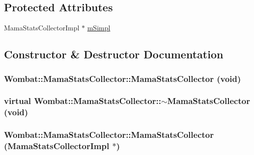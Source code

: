 \subsection*{Protected Attributes}
\begin{DoxyCompactItemize}
\item 
MamaStatsCollectorImpl $\ast$ \hyperlink{classWombat_1_1MamaStatsCollector_ac451f4b0b0326f503b3301f7b89a9e36}{mSimpl}
\end{DoxyCompactItemize}


\subsection{Constructor \& Destructor Documentation}
\hypertarget{classWombat_1_1MamaStatsCollector_ade3bf71a38b6085d9922a0276c9960a1}{
\subsubsection[{MamaStatsCollector}]{\setlength{\rightskip}{0pt plus 5cm}Wombat::MamaStatsCollector::MamaStatsCollector (void)}}
\label{classWombat_1_1MamaStatsCollector_ade3bf71a38b6085d9922a0276c9960a1}
\hypertarget{classWombat_1_1MamaStatsCollector_adaa09d4d8b5d79473d5abb4b257d9e02}{
\subsubsection[{$\sim$MamaStatsCollector}]{\setlength{\rightskip}{0pt plus 5cm}virtual Wombat::MamaStatsCollector::$\sim$MamaStatsCollector (void)}}
\label{classWombat_1_1MamaStatsCollector_adaa09d4d8b5d79473d5abb4b257d9e02}
\hypertarget{classWombat_1_1MamaStatsCollector_acd6e682017c8c4060b3303d30f4d3ad6}{
\subsubsection[{MamaStatsCollector}]{\setlength{\rightskip}{0pt plus 5cm}Wombat::MamaStatsCollector::MamaStatsCollector (MamaStatsCollectorImpl $\ast$)}}
\label{classWombat_1_1MamaStatsCollector_acd6e682017c8c4060b3303d30f4d3ad6}


